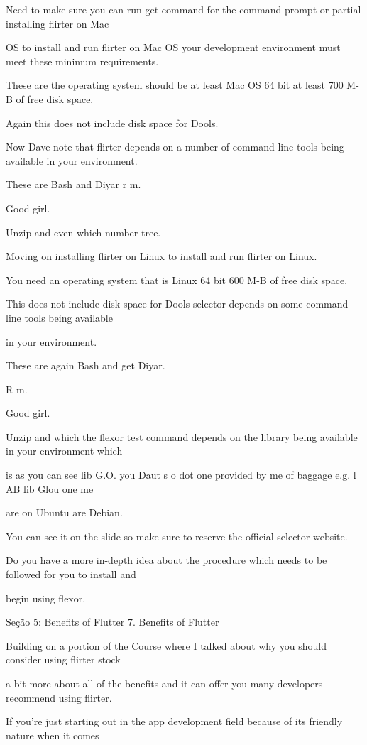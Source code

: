 Need to make sure you can run get command for the command prompt or partial installing flirter on Mac

OS to install and run flirter on Mac OS your development environment must meet these minimum requirements.

These are the operating system should be at least Mac OS 64 bit at least 700 M-B of free disk space.

Again this does not include disk space for Dools.

Now Dave note that flirter depends on a number of command line tools being available in your environment.

These are Bash and Diyar r m.

Good girl.

Unzip and even which number tree.

Moving on installing flirter on Linux to install and run flirter on Linux.

You need an operating system that is Linux 64 bit 600 M-B of free disk space.

This does not include disk space for Dools selector depends on some command line tools being available

in your environment.

These are again Bash and get Diyar.

R m.

Good girl.

Unzip and which the flexor test command depends on the library being available in your environment which

is as you can see lib G.O. you Daut s o dot one provided by me of baggage e.g. l AB lib Glou one me

are on Ubuntu are Debian.

You can see it on the slide so make sure to reserve the official selector website.

Do you have a more in-depth idea about the procedure which needs to be followed for you to install and

begin using flexor.



Seção 5: Benefits of Flutter
7. Benefits of Flutter

Building on a portion of the Course where I talked about why you should consider using flirter stock

a bit more about all of the benefits and it can offer you many developers recommend using flirter.

If you're just starting out in the app development field because of its friendly nature when it comes


